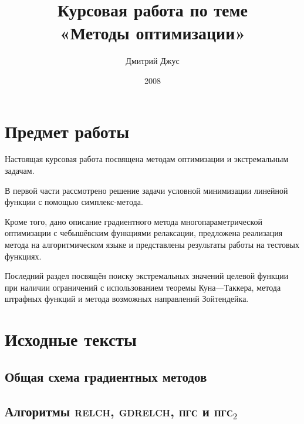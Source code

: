\documentclass[titlepage]{article}
\newcommand{\relch}{\textsc{relch}}
\newcommand{\gdrelch}{\textsc{gdrelch}}
\newcommand{\gd}{\textsc{пгс}}
\newcommand{\rgd}{\textsc{пгс}$_2$}
\theoremstyle{ruthm}
\numberwithin{thm}{section}
\theoremstyle{rurem}
\theoremstyle{rudfn}
\numberwithin{equation}{section}
\begin{document}
\author{Дмитрий Джус}
\title{Курсовая работа по теме \\
  \Huge{«Методы оптимизации»}}
\pretitle{\begin{center}\LARGE}
\posttitle{\par\end{center}\vskip 3pc}
\date{2008}
\maketitle

\clearpage
\tableofcontents
\listoffigures

\clearpage
\section*{Предмет работы}

Настоящая курсовая работа посвящена методам оптимизации и
экстремальным задачам.

В первой части рассмотрено решение задачи условной минимизации
линейной функции с помощью симплекс-метода.

Кроме того, дано описание градиентного метода многопараметрической
оптимизации с чебышёвским функциями релаксации, предложена реализация
метода на алгоритмическом языке и представлены результаты работы на
тестовых функциях.

Последний раздел посвящён поиску экстремальных значений целевой
функции при наличии ограничений с использованием теоремы Куна—Таккера,
метода штрафных функций и метода возможных направлений Зойтендейка.

\pagestyle{fancy}
\clearpage


\clearpage


\clearpage


\clearpage


\clearpage
\appendix
\section{Исходные тексты}
\label{sec:sources}

\subsection{Общая схема градиентных методов}


\subsection{Алгоритмы \relch{}, \gdrelch{}, \gd{} и \rgd{}}

\end{document}

